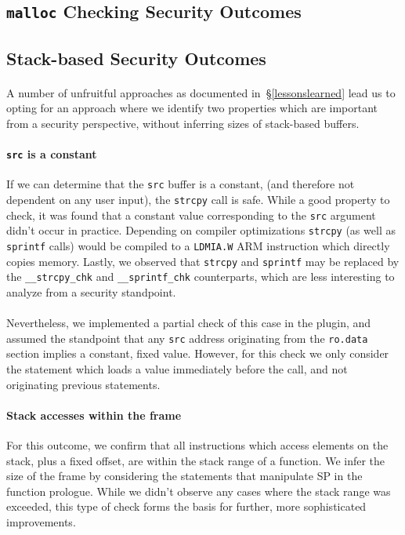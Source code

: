 \documentclass[letterpaper,11pt]{article}
\begin{document}
\subsection{\texttt{malloc} Checking Security Outcomes}

\subsection{Stack-based Security Outcomes}
\label{stackoutcomes}

\paragraph{}
A number of unfruitful approaches as documented in~\S\ref{lessonslearned} lead us
to opting for an approach where we identify two properties which are important
from a security perspective, without inferring sizes of stack-based buffers.

\paragraph{\texttt{src} is a constant}
If we can determine that the \texttt{src} buffer is a constant, (and therefore
not dependent on any user input), the \texttt{strcpy} call is safe. While a
good property to check, it was found that a constant value corresponding to the
\texttt{src} argument didn't occur in practice. Depending on compiler
optimizations \texttt{strcpy} (as well as \texttt{sprintf} calls) would be
compiled to a \texttt{LDMIA.W} ARM instruction which directly copies memory.
Lastly, we observed that \texttt{strcpy} and \texttt{sprintf} may be replaced
by the \texttt{\_\_strcpy\_chk} and \texttt{\_\_sprintf\_chk} counterparts,
which are less interesting to analyze from a security standpoint.

\paragraph{}
Nevertheless, we implemented a partial check of this case in the plugin, and
assumed the standpoint that any \texttt{src} address originating from the
\texttt{ro.data} section implies a constant, fixed value. However, for this
check we only consider the statement which loads a value immediately before the
call, and not originating previous statements. %

\paragraph{Stack accesses within the frame}
For this outcome, we confirm that all instructions which access elements on
the stack, plus a fixed offset, are within the stack range of a function. We
infer the size of the frame by considering the statements that manipulate
SP in the function prologue. While we didn't observe any cases where the
stack range was exceeded, this type of check forms the basis for further,
more sophisticated improvements.
\end{document}

